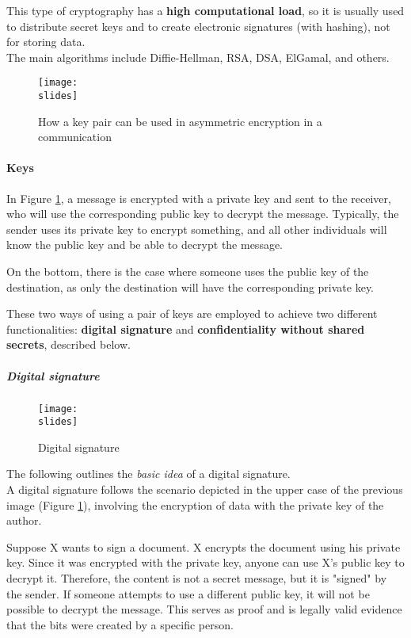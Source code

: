 This type of cryptography has a \textbf{high computational load}, so it is usually used to distribute secret keys and to create electronic signatures (with hashing), not for storing data. \\
The main algorithms include Diffie-Hellman, RSA, DSA, ElGamal, and others.

\begin{figure}[h]
    \centering
    \texttt{[image: \\slides]}
    \caption{How a key pair can be used in asymmetric encryption in a communication}
    \label{fig:asymmcrypto}
\end{figure}

\paragraph{Keys}
In Figure \ref*{fig:asymmcrypto}, a message is encrypted with a private key and sent to the receiver, who will use the corresponding public key to decrypt the message. Typically, the sender uses its private key to encrypt something, and all other individuals will know the public key and be able to decrypt the message.

On the bottom, there is the case where someone uses the public key of the destination, as only the destination will have the corresponding private key.

These two ways of using a pair of keys are employed to achieve two different functionalities: \textbf{digital signature} and \textbf{confidentiality without shared secrets}, described below.



\subparagraph{Digital signature}
\begin{figure}[h]
    \centering
    \texttt{[image: \\slides]}
    \caption{Digital signature}
\end{figure}
The following outlines the \textit{basic idea} of a digital signature.\\
A digital signature follows the scenario depicted in the upper case of the previous image (Figure \ref*{fig:asymmcrypto}),
involving the encryption of data with the private key of the author.

Suppose X wants to sign a document. X encrypts the document using his private key. Since it was encrypted with the private key, anyone can use X's public key to decrypt it. Therefore, the content is not a secret message, but it is "signed" by the sender. If someone attempts to use a different public key, it will not be possible to decrypt the message. This serves as proof and is legally valid evidence that the bits were created by a specific person.

